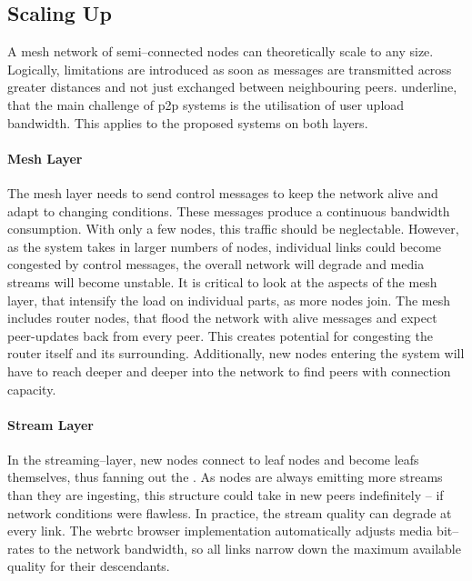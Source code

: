\subsection{Scaling Up}
A mesh network of semi–connected nodes can theoretically scale to any size. Logically, limitations are introduced as soon as messages are transmitted across greater distances and not just exchanged between neighbouring peers. \citet[p. 748-750]{tanenbaum_wetherall_2011} underline, that the main challenge of \gls{p2p} systems is the utilisation of user upload bandwidth. This applies to the proposed systems on both layers.

\paragraph{Mesh Layer}
The mesh layer needs to send control messages to keep the network alive and adapt to changing conditions. These messages produce a continuous bandwidth consumption. With only a few nodes, this traffic should be neglectable. However, as the system takes in larger numbers of nodes, individual links could become congested by control messages, the overall network will degrade and media streams will become unstable. It is critical to look at the aspects of the mesh layer, that intensify the load on individual parts, as more nodes join.
The mesh includes router nodes, that flood the network with alive messages and expect \glspl{peer-update} back from every peer. This creates potential for congesting the router itself and its surrounding. Additionally, new nodes entering the system will have to reach deeper and deeper into the network to find peers with connection capacity.

\paragraph{Stream Layer}
In the streaming–layer, new nodes connect to leaf nodes and become leafs themselves, thus fanning out the . As nodes are always emitting more streams than they are ingesting, this structure could take in new peers indefinitely – if network conditions were flawless. In practice, the stream quality can degrade at every link. The \gls{webrtc} browser implementation automatically adjusts media bit–rates to the network bandwidth, so all links narrow down the maximum available quality for their descendants.

